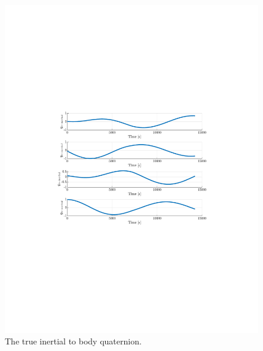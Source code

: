 \documentclass[]{article}
\begin{document}
\begin{figure}[!h]
	\centering
	\includegraphics[width=\linewidth,trim={4cm, 8cm, 4cm, 8cm},clip]{figs/P2Q3.pdf}
	\caption{The true inertial to body quaternion.}
	\label{fig:P2Q3}
\end{figure}
\end{document}

